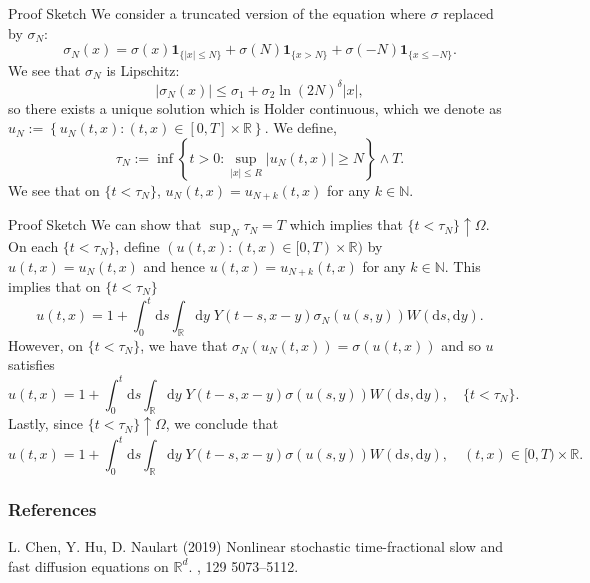 \documentclass{beamer}%
\numberwithin{equation}{section}
\newcommand{\R}{\mathbb{R}}
\newcommand{\ud}{\ensuremath{\mathrm{d} }}
\begin{document}
\begin{frame}{Proof Sketch}
We consider a truncated version of the equation where $\sigma$ replaced by $\sigma_N$: 
	\[
		\sigma_N(x) = \sigma(x)\textbf{1}_{\{|x| \le N\}} + \sigma(N)\textbf{1}_{\{x  >N\}} + \sigma(-N)\textbf{1}_{\{x \le -N\}}.
	\]
We see that $\sigma_N$ is Lipschitz:
	\[
		|\sigma_N(x)| \le \sigma_1 + \sigma_2 \ln(2N)^{\delta}|x|,
	\]
so there exists a unique solution which is Holder continuous, which we denote as $u_N := \left\{ u_N(t,x) : (t,x) \in [0,T] \times \R \right\}$. We define,
	\[
		\tau_N := \inf \left\{ t>0 : \sup_{|x| \le R} |u_N(t,x)| \ge N \right\} \wedge T .
	\]
We see that on $\{t < \tau_N\}$, $u_N(t,x) = u_{N+k}(t,x)$ for any $k \in \mathbb{N}$.
\end{frame}

\begin{frame}{Proof Sketch}
We can show that $\sup_N \tau_N = T$ which implies that $\{t < \tau_N \} \uparrow \Omega$. On each $\{ t < \tau_N \}$, define $(u(t,x) : (t,x) \in [0,T) \times \R)$ by $u(t,x) = u_N(t,x)$ and hence $u(t,x) = u_{N+k}(t,x)$ for any $k\in \mathbb{N}$. This implies that on $\{ t < \tau_N \}$ 
	\[
	u(t,x) = 1 + \int_0^t \ud s \int_{\R} \ud y \; Y(t-s,x-y) \sigma_N(u(s,y)) W(\ud s, \ud y).
	\]
	However, on $\{ t < \tau_N \}$, we have that $\sigma_N(u_N(t,x)) = \sigma(u(t,x))$ and so $u$ satisfies
	\[
	u(t,x) = 1 + \int_0^t \ud s \int_{\R} \ud y \; Y(t-s,x-y) \sigma(u(s,y)) W(\ud s, \ud y), \quad \{ t < \tau_N \}.
	\]
	Lastly, since $\{ t < \tau_N \} \uparrow \Omega$, we conclude that 
	\begin{equation}
	\label{E:SupLinMildSol}
	u(t,x) = 1 + \int_0^t \ud s \int_{\R} \ud y \; Y(t-s,x-y) \sigma(u(s,y)) W(\ud s, \ud y), \quad (t,x) \in [0,T) \times \R.
	\end{equation}
\end{frame}

		\begin{frame}
		\frametitle{References}
		\small
		
		\begin{thebibliography}{999}
			L. Chen, Y. Hu, D. Naulart (2019)
			\newblock Nonlinear stochastic time-fractional slow and fast diffusion equations on $\R^d$.
			, 129 5073--5112.
		\end{thebibliography}
	\end{frame}
\end{document}

